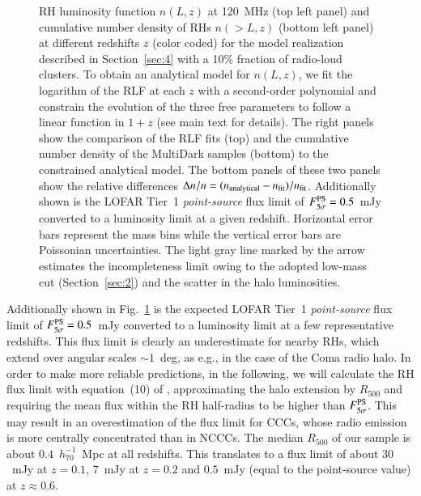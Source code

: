 \documentclass[useAMS,usenatbib]{mn2e}
\begin{document}
\begin{figure}
\caption{RH luminosity function $n(L,z)$ at 120~MHz (top left panel) and cumulative
  number density of RHs  $n(>L,z)$ (bottom left panel) at different redshifts $z$ (color
  coded) for the model realization described in Section~\ref{sec:4} with a 10\%
  fraction of radio-loud clusters. To obtain an analytical model for $n(L,z)$,
  we fit the logarithm of the RLF at each $z$ with a second-order polynomial and
  constrain the evolution of the three free parameters to follow a linear
  function in $1+z$ (see main text for details). The right panels show the
  comparison of the RLF fits (top) and the cumulative number density of the
  MultiDark samples (bottom) to the constrained analytical model. The bottom panels of these
  two panels show the relative differences $\Delta n / n =
  (n_{{\mathrm{analytical}}} - n_{{\mathrm{fit}}})/n_{{\mathrm{fit}}}$. Additionally shown is
  the LOFAR Tier~1 \emph{point-source} flux limit of
  $F_{5\sigma}^{{\mathrm{PS}}}=0.5$~mJy \citep{2012JApA..tmp...34R} converted to a
  luminosity limit at a given redshift. Horizontal error bars represent the mass
  bins while the vertical error bars are Poissonian uncertainties.  The light
  gray line marked by the arrow estimates the incompleteness limit owing to the
  adopted low-mass cut (Section~\ref{sec:2}) and the scatter in the halo
  luminosities.}
\label{fig:RLF_120}
\end{figure} 

Additionally shown in Fig.~\ref{fig:RLF_120} is the expected LOFAR Tier~1
\emph{point-source} flux limit of $F_{5\sigma}^{{\mathrm{PS}}}=0.5$~mJy
\citep{2012JApA..tmp...34R} converted to a luminosity limit at a few representative
redshifts. This flux limit is clearly an underestimate for nearby RHs, which
extend over angular scales $\sim1$~deg, as e.g., in the case of the Coma radio
halo. In order to make more reliable predictions, in the following, we will
calculate the RH flux limit with equation~(10) of \cite{2010A&A...509A..68C},
approximating the halo extension by $R_{500}$ and requiring the mean flux within
the RH half-radius to be higher than $F_{5\sigma}^{{\mathrm{PS}}}$. This may result
in an overestimation of the flux limit for CCCs, whose radio emission is more
centrally concentrated than in NCCCs. The median $R_{500}$ of our sample is
about $0.4$~$h_{70}^{-1}$~Mpc at all redshifts. This translates to a flux limit
of about $30$~mJy at $z = 0.1$, $7$~mJy at $z = 0.2$ and $0.5$~mJy (equal to the
point-source value) at $z \approx 0.6$.
\end{document}
